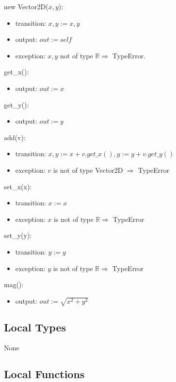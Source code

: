 \documentclass[12pt]{article}
\begin{document}
new Vector2D($x, y$):
\begin{itemize}
\item transition: $x, y := x, y$
\item output: $\mathit{out} := \mathit{self}$
\item exception: $x, y$ not of type $\mathbb{R} \Rightarrow$ TypeError.
\end{itemize}

\noindent get\_x():
\begin{itemize}
\item output: $out := x$
\end{itemize}

\noindent get\_y():
\begin{itemize}
\item output: $out := y$
\end{itemize}

\noindent add(v):
\begin{itemize}
\item transition: $x, y := x + v.get\_x(), y := y + v.get\_y()$
\item exception: $v$ is not of type Vector2D $\Rightarrow$ TypeError 
\end{itemize}

\noindent set\_x(x):
\begin{itemize}
\item transition: $x := x$
\item exception: $x$ is not of type $\mathbb{R} \Rightarrow$ TypeError
\end{itemize}

\noindent set\_y(y):
\begin{itemize}
\item transition: $y := y$
\item exception: $y$ is not of type $\mathbb{R} \Rightarrow$ TypeError
\end{itemize}

\noindent mag():
\begin{itemize}
\item output: $out := \sqrt{x^2 + y^2}$
\end{itemize}


\subsection* {Local Types}

None

\subsection* {Local Functions}
\end{document}
